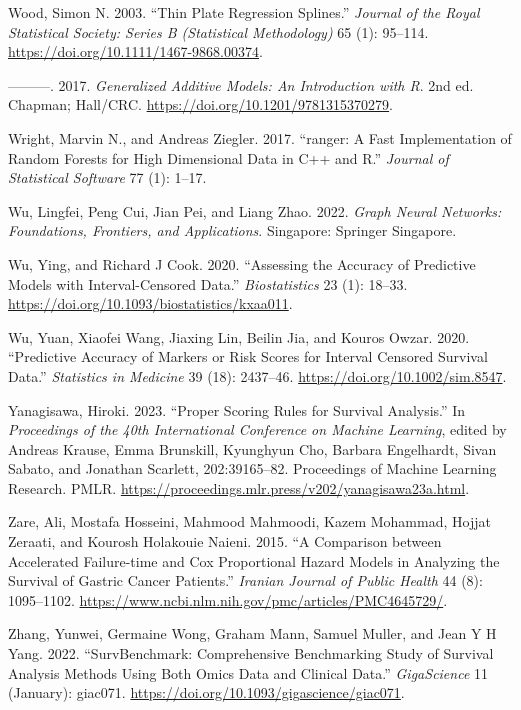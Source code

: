 \documentclass[
  letterpaper,
  krantz2]{style/krantz}
\newlength{\cslhangindent}
\newenvironment{CSLReferences}[2] %
 {\begin{list}{}{%
  \setlength{\itemindent}{0pt}
  \setlength{\leftmargin}{0pt}
  \setlength{\parsep}{0pt}
  \ifodd #1
   \setlength{\leftmargin}{\cslhangindent}
   \setlength{\itemindent}{-1\cslhangindent}
  \fi
  \setlength{\itemsep}{#2\baselineskip}}}
 {\end{list}}
\begin{document}
\begin{CSLReferences}{1}{0}
Wood, Simon N. 2003. {``{Thin Plate Regression Splines}.''}
\emph{Journal of the Royal Statistical Society: Series B (Statistical
Methodology)} 65 (1): 95--114.
\url{https://doi.org/10.1111/1467-9868.00374}.

---------. 2017. \emph{{Generalized Additive Models: An Introduction
with R}}. 2nd ed. Chapman; Hall/CRC.
\url{https://doi.org/10.1201/9781315370279}.

Wright, Marvin N., and Andreas Ziegler. 2017. {``{ranger: A Fast
Implementation of Random Forests for High Dimensional Data in C++ and
R}.''} \emph{Journal of Statistical Software} 77 (1): 1--17.

Wu, Lingfei, Peng Cui, Jian Pei, and Liang Zhao. 2022. \emph{Graph
Neural Networks: Foundations, Frontiers, and Applications}. Singapore:
Springer Singapore.

Wu, Ying, and Richard J Cook. 2020. {``Assessing the Accuracy of
Predictive Models with Interval-Censored Data.''} \emph{Biostatistics}
23 (1): 18--33. \url{https://doi.org/10.1093/biostatistics/kxaa011}.

Wu, Yuan, Xiaofei Wang, Jiaxing Lin, Beilin Jia, and Kouros Owzar. 2020.
{``Predictive Accuracy of Markers or Risk Scores for Interval Censored
Survival Data.''} \emph{Statistics in Medicine} 39 (18): 2437--46.
\url{https://doi.org/10.1002/sim.8547}.

Yanagisawa, Hiroki. 2023. {``Proper Scoring Rules for Survival
Analysis.''} In \emph{Proceedings of the 40th International Conference
on Machine Learning}, edited by Andreas Krause, Emma Brunskill,
Kyunghyun Cho, Barbara Engelhardt, Sivan Sabato, and Jonathan Scarlett,
202:39165--82. Proceedings of Machine Learning Research. PMLR.
\url{https://proceedings.mlr.press/v202/yanagisawa23a.html}.

Zare, Ali, Mostafa Hosseini, Mahmood Mahmoodi, Kazem Mohammad, Hojjat
Zeraati, and Kourosh Holakouie Naieni. 2015. {``{A Comparison between
Accelerated Failure-time and Cox Proportional Hazard Models in Analyzing
the Survival of Gastric Cancer Patients.}''} \emph{Iranian Journal of
Public Health} 44 (8): 1095--1102.
\url{https://www.ncbi.nlm.nih.gov/pmc/articles/PMC4645729/}.

Zhang, Yunwei, Germaine Wong, Graham Mann, Samuel Muller, and Jean Y H
Yang. 2022. {``SurvBenchmark: Comprehensive Benchmarking Study of
Survival Analysis Methods Using Both Omics Data and Clinical Data.''}
\emph{GigaScience} 11 (January): giac071.
\url{https://doi.org/10.1093/gigascience/giac071}.


\end{CSLReferences}
\end{document}

